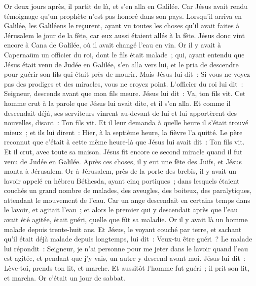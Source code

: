 \begin{multicols}{2}
Or deux jours après, il partit de là, et s'en alla en Galilée.
Car Jésus avait rendu témoignage qu'un prophète n'est pas honoré dans son pays.
Lorsqu'il arriva en Galilée, les Galiléens le reçurent, ayant vu toutes les choses qu'il avait faites à Jérusalem le jour de la fête, car eux aussi étaient allés à la fête.
Jésus donc vint encore à Cana de Galilée, où il avait changé l'eau en vin. Or il y avait à Capernaüm un officier du roi, dont le fils était malade~;
qui, ayant entendu que Jésus était venu de Judée en Galilée, s'en alla vers lui, et le pria de descendre pour guérir son fils qui était près de mourir.
Mais Jésus lui dit~: Si vous ne voyez pas des prodiges et des miracles, vous ne croyez point.
L'officier du roi lui dit~: Seigneur, descends avant que mon fils meure.
Jésus lui dit~: Va, ton fils vit. Cet homme crut à la parole que Jésus lui avait dite, et il s'en alla.
Et comme il descendait déjà, ses serviteurs vinrent au-devant de lui et lui apportèrent des nouvelles, disant~: Ton fils vit.
Et il leur demanda à quelle heure il s'était trouvé mieux~; et ils lui dirent~: Hier, à la septième heure, la fièvre l'a quitté.
Le père reconnut que c'était à cette même heure-là que Jésus lui avait dit~: Ton fils vit. Et il crut, avec toute sa maison.
Jésus fit encore ce second miracle quand il fut venu de Judée en Galilée.
\VerseOne{}Après ces choses, il y eut une fête des Juifs, et Jésus monta à Jérusalem.
Or à Jérusalem, près de la porte des brebis, il y avait un lavoir appelé en hébreu Béthesda, ayant cinq portiques~;
dans lesquels étaient couchés un grand nombre de malades, des aveugles, des boiteux, des paralytiques, attendant le mouvement de l'eau.
Car un ange descendait en certains temps dans le lavoir, et agitait l'eau~; et alors le premier qui y descendait après que l'eau avait été agitée, était guéri, quelle que fût sa maladie.
Or il y avait là un homme malade depuis trente-huit ans.
Et Jésus, le voyant couché par terre, et sachant qu'il était déjà malade depuis longtemps, lui dit~: Veux-tu être guéri~?
Le malade lui répondit~: Seigneur, je n'ai personne pour me jeter dans le lavoir quand l'eau est agitée, et pendant que j'y vais, un autre y descend avant moi.
Jésus lui dit~: Lève-toi, prends ton lit, et marche.
Et aussitôt l'homme fut guéri~; il prit son lit, et marcha. Or c'était un jour de sabbat.

\end{multicols}
